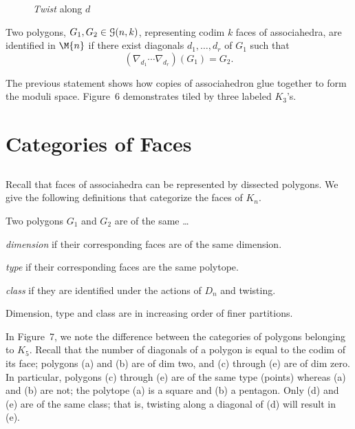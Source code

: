 \documentclass[10pt]{amsart}
\begin{document}
\begin{figure} [h]
\caption{{\em Twist} along $d$}
\label{twist}
\end{figure}

\begin{thm} \textup{\cite[\S4]{dev}}
Two polygons, $G_1, G_2 \in {\mathcal G}(n,k)$, representing codim $k$ faces of associahedra, are identified in $\M{n}$ if there exist diagonals $d_1, \ldots, d_r$ of $G_1$ such that $$(\nabla_{d_1} \cdots \nabla_{d_r}) (G_1) = G_2.$$
\label{t:glue}
\end{thm}

\noindent The previous statement shows how copies of associahedron glue together
to form the moduli space. Figure~6 demonstrates  tiled by three labeled $K_3$'s.

\begin{figure} [h]
\caption{}
\label{m04}
\end{figure}


\section {Categories of Faces}

\subsection{}
Recall that faces of associahedra can be represented by dissected polygons.  We give the following definitions that categorize the faces of $K_n$.

\begin{defn}
Two polygons $G_1$ and $G_2$ are of the same \ldots 

\emph{dimension} if their corresponding faces are of the same dimension.

\emph{type} if their corresponding faces are the same polytope.

\emph{class} if they are identified under the actions of $D_n$ and twisting.

\noindent Dimension, type and class are in increasing order of finer partitions.
\end{defn}

\begin{exmp}
In Figure~7, we note the difference between the categories of polygons belonging to $K_5$. Recall that the number of diagonals of a polygon is equal to the codim of its face; polygons (a) and (b) are of dim two, and (c) through (e) are of dim zero.  In particular, polygons (c) through (e) are of the same type (points) whereas (a) and (b) are not; the polytope (a) is a square and (b) a pentagon. Only (d) and (e) are of the same class; that is, twisting along a diagonal of (d) will result in (e). 
\end{exmp}
\end{document}
